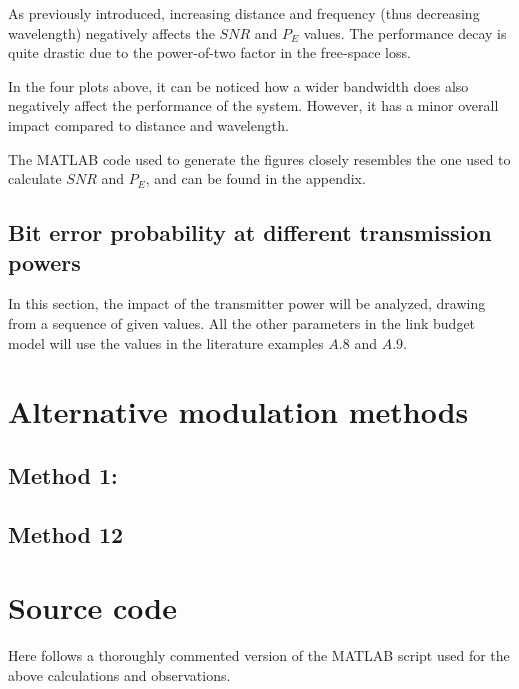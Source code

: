 
As previously introduced, increasing distance and frequency (thus decreasing wavelength) negatively affects the $SNR$ and $P_E$ values.
The performance decay is quite drastic due to the power-of-two factor in the free-space loss.



In the four plots above, it can be noticed how a wider bandwidth does also negatively affect the performance of the system.
However, it has a minor overall impact compared to distance and wavelength.

The MATLAB code used to generate the figures closely resembles the one used to calculate $SNR$ and $P_E$, and can be found in the appendix.


\subsection{Bit error probability at different transmission powers}
In this section, the impact of the transmitter power will be analyzed, drawing from a sequence of given values.
All the other parameters in the link budget model will use the values in the literature examples $A.8$ and $A.9$.


\section{Alternative modulation methods}

\subsection{Method 1: }

\subsection{Method 12 }


\section{Source code}
Here follows a thoroughly commented version of the MATLAB script used for the above calculations and observations.

